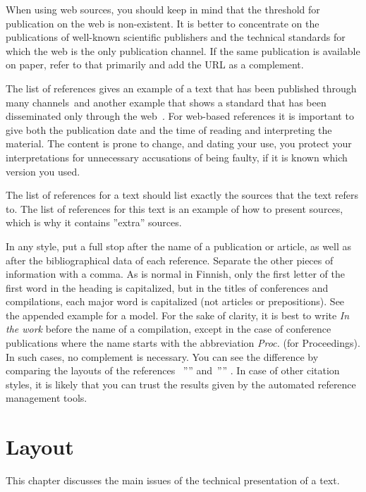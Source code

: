 When using web sources, you should keep in mind that the threshold for publication on the web 
is non-existent. It is better to concentrate on the publications of well-known scientific 
publishers and the technical standards for which the web is the only publication channel. If 
the same publication is available on paper, refer to that primarily and add the URL as a complement.


The list of references gives an example of a text that has been published through many 
channels~\citep{abiteboul,dietinger}and another example that shows a standard that has 
been disseminated only through the web~\citep{bray}. For web-based
references it is important to give both the publication date and the
time of reading and interpreting the material. The content is prone to
change, and dating your use, you protect your interpretations for
unnecessary accusations of being faulty, if it is known which version
you used.



The list of references for a text should list exactly the sources that the text refers to. 
The list of references for this text is an example of how to present sources, 
which is why it contains ''extra'' sources.


In any style,
put a full stop after the name of a publication or article, as well as after the bibliographical 
data of each reference. Separate the other pieces of information with a comma. As is normal in 
Finnish, only the first letter of the first word in the heading is capitalized, but in the titles of 
conferences and compilations, each major word is capitalized (not articles or prepositions). See the 
appended example for a model. For the sake of clarity, it is best to write {\em In the work} before 
the name of a compilation, except in the case of conference publications where the name starts with 
the abbreviation {\em Proc.} (for Proceedings). In such cases, no complement is necessary. You can 
see the difference by comparing the layouts of the references ~''\citep{dantowsley90}'' and~''\citep{gannonetal89}'' .
In case of other citation styles, it is likely that you can trust the
results given by the automated reference management tools.

\chapter{Layout}

This chapter discusses the main issues of the technical presentation of a text.


